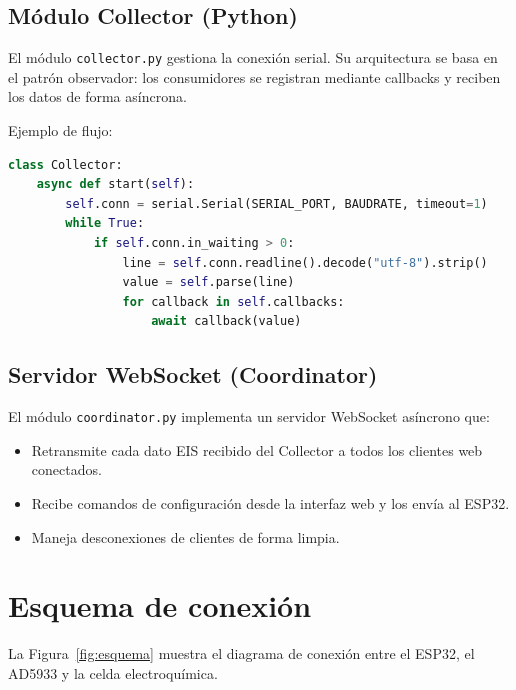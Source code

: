 \documentclass[11pt,a4paper,spanish]{book}
\begin{document}
\section{M\'{o}dulo Collector (Python)}

El m\'{o}dulo \texttt{collector.py} gestiona la conexi\'{o}n serial. Su arquitectura se basa en el patr\'{o}n observador: los consumidores se registran mediante callbacks y reciben los datos de forma as\'{i}ncrona.

Ejemplo de flujo:
\begin{lstlisting}[language=Python, caption={Fragmento del Collector}]
class Collector:
    async def start(self):
        self.conn = serial.Serial(SERIAL_PORT, BAUDRATE, timeout=1)
        while True:
            if self.conn.in_waiting > 0:
                line = self.conn.readline().decode("utf-8").strip()
                value = self.parse(line)
                for callback in self.callbacks:
                    await callback(value)
\end{lstlisting}

\section{Servidor WebSocket (Coordinator)}

El m\'{o}dulo \texttt{coordinator.py} implementa un servidor WebSocket as\'{i}ncrono que:
\begin{itemize}
	\item Retransmite cada dato EIS recibido del Collector a todos los clientes web conectados.
	\item Recibe comandos de configuraci\'{o}n desde la interfaz web y los env\'{i}a al ESP32.
	\item Maneja desconexiones de clientes de forma limpia.
\end{itemize}


\chapter{Esquema de conexi\'{o}n}

La Figura~\ref{fig:esquema} muestra el diagrama de conexi\'{o}n entre el ESP32, el AD5933 y la celda electroqu\'{i}mica.
\end{document}

